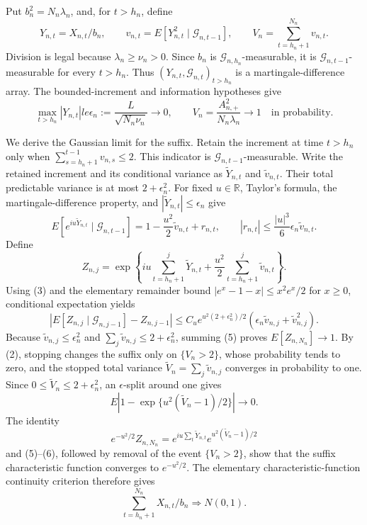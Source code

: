 Put \(b_n^2=N_n\lambda_n\), and, for \(t>h_n\), define
\[
 Y_{n,t}=X_{n,t}/b_n,\qquad
 v_{n,t}=E[Y_{n,t}^2\mid\mathcal G_{n,t-1}],\qquad
 V_n=\sum_{t=h_n+1}^{N_n}v_{n,t}.
\tag{1}
\]
Division is legal because \(\lambda_n\ge\nu_n>0\). Since \(b_n\) is \(\mathcal G_{n,h_n}\)-measurable, it is \(\mathcal G_{n,t-1}\)-measurable for every \(t>h_n\). Thus \((Y_{n,t},\mathcal G_{n,t})_{t>h_n}\) is a martingale-difference array. The bounded-increment and information hypotheses give
\[
 \max_{t>h_n}|Y_{n,t}|le
 \epsilon_n:=\frac{L}{\sqrt{N_n\nu_n}}\longrightarrow0,
 \qquad
 V_n=\frac{A_{n,+}^2}{N_n\lambda_n}\longrightarrow1
 \quad\text{in probability}.
\tag{2}
\]

We derive the Gaussian limit for the suffix. Retain the increment at time \(t>h_n\) only when \(\sum_{s=h_n+1}^{t-1}v_{n,s}\le2\). This indicator is \(\mathcal G_{n,t-1}\)-measurable. Write the retained increment and its conditional variance as \(\widetilde Y_{n,t}\) and \(\widetilde v_{n,t}\). Their total predictable variance is at most \(2+\epsilon_n^2\). For fixed \(u\in\mathbb R\), Taylor's formula, the martingale-difference property, and \(|\widetilde Y_{n,t}|\le\epsilon_n\) give
\[
 E[e^{iu\widetilde Y_{n,t}}\mid\mathcal G_{n,t-1}]
 =1-\frac{u^2}{2}\widetilde v_{n,t}+r_{n,t},
 \qquad
 |r_{n,t}|\le\frac{|u|^3}{6}\epsilon_n\widetilde v_{n,t}.
\tag{3}
\]
Define
\[
 Z_{n,j}=\exp\left\{iu\sum_{t=h_n+1}^j\widetilde Y_{n,t}
 +\frac{u^2}{2}\sum_{t=h_n+1}^j\widetilde v_{n,t}\right\}.
\tag{4}
\]
Using (3) and the elementary remainder bound \(|e^x-1-x|\le x^2e^x/2\) for \(x\ge0\), conditional expectation yields
\[
 \left|E[Z_{n,j}\mid\mathcal G_{n,j-1}]-Z_{n,j-1}\right|
 \le C_u e^{u^2(2+\epsilon_n^2)/2}
 \left(\epsilon_n\widetilde v_{n,j}+\widetilde v_{n,j}^2\right).
\tag{5}
\]
Because \(\widetilde v_{n,j}\le\epsilon_n^2\) and \(\sum_j\widetilde v_{n,j}\le2+\epsilon_n^2\), summing (5) proves \(E[Z_{n,N_n}]\to1\). By (2), stopping changes the suffix only on \(\{V_n>2\}\), whose probability tends to zero, and the stopped total variance \(\widetilde V_n=\sum_j\widetilde v_{n,j}\) converges in probability to one. Since \(0\le\widetilde V_n\le2+\epsilon_n^2\), an \(\epsilon\)-split around one gives
\[
 E\left|1-\exp\{u^2(\widetilde V_n-1)/2\}\right|\longrightarrow0.
\tag{6}
\]
The identity
\[
 e^{-u^2/2}Z_{n,N_n}
 =e^{iu\sum_t\widetilde Y_{n,t}}
 e^{u^2(\widetilde V_n-1)/2}
\]
and (5)--(6), followed by removal of the event \(\{V_n>2\}\), show that the suffix characteristic function converges to \(e^{-u^2/2}\). The elementary characteristic-function continuity criterion therefore gives
\[
 \sum_{t=h_n+1}^{N_n}X_{n,t}/b_n\Rightarrow N(0,1).
\tag{7}
\]

